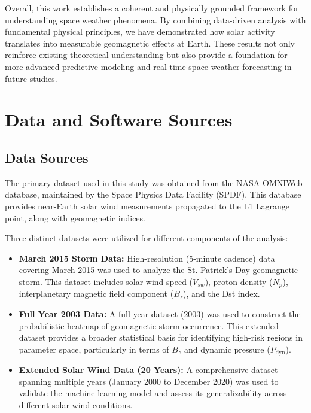 \documentclass[12pt]{article}
\begin{document}
Overall, this work establishes a coherent and physically grounded framework for understanding space weather phenomena. By combining data-driven analysis with fundamental physical principles, we have demonstrated how solar activity translates into measurable geomagnetic effects at Earth. These results not only reinforce existing theoretical understanding but also provide a foundation for more advanced predictive modeling and real-time space weather forecasting in future studies.

\section{Data and Software Sources}

\subsection{Data Sources}

The primary dataset used in this study was obtained from the NASA OMNIWeb database, maintained by the Space Physics Data Facility (SPDF). This database provides near-Earth solar wind measurements propagated to the L1 Lagrange point, along with geomagnetic indices.

Three distinct datasets were utilized for different components of the analysis:

\begin{itemize}
    \item \textbf{March 2015 Storm Data:} High-resolution (5-minute cadence) data covering March 2015 was used to analyze the St. Patrick’s Day geomagnetic storm. This dataset includes solar wind speed ($V_{sw}$), proton density ($N_p$), interplanetary magnetic field component ($B_z$), and the Dst index.

    \item \textbf{Full Year 2003 Data:} A full-year dataset (2003) was used to construct the probabilistic heatmap of geomagnetic storm occurrence. This extended dataset provides a broader statistical basis for identifying high-risk regions in parameter space, particularly in terms of $B_z$ and dynamic pressure ($P_{\mathrm{dyn}}$).

    \item \textbf{Extended Solar Wind Data (20 Years):} A comprehensive dataset spanning multiple years (January 2000 to December 2020) was used to validate the machine learning model and assess its generalizability across different solar wind conditions.
\end{itemize}
\end{document}
